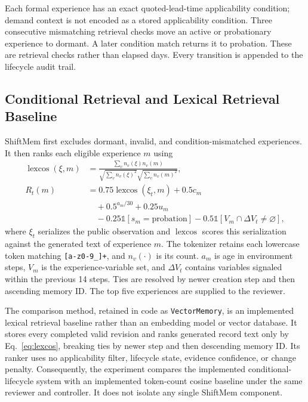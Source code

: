 Each formal experience has an exact quoted-lead-time applicability condition;
demand context is not encoded as a stored applicability condition.
Three consecutive mismatching retrieval checks move an active or probationary
experience to dormant. A later condition match returns it to probation. These
are retrieval checks rather than elapsed days. Every transition is appended to
the lifecycle audit trail.

\subsection{Conditional Retrieval and Lexical Retrieval Baseline}
\label{sec:retrieval}

ShiftMem first excludes dormant, invalid, and condition-mismatched experiences.
It then ranks each eligible experience $m$ using
\begin{align}
 \operatorname{lexcos}(\xi,m)
 &=\frac{\sum_v n_v(\xi)n_v(m)}
 {\sqrt{\sum_v n_v(\xi)^2}\sqrt{\sum_v n_v(m)^2}}, \label{eq:lexcos}\\
 R_t(m)&=0.75\operatorname{lexcos}(\xi_t,m)+0.5c_m \nonumber\\
 &\quad{}+0.5^{a_m/30}+0.25u_m \nonumber\\
 &\quad{}-0.25\mathbb{1}[s_m=\mathrm{probation}]
 -0.5\mathbb{1}[V_m\cap\Delta V_t\neq\varnothing],
 \label{eq:retrieval-score}
\end{align}
where $\xi_t$ serializes the public observation and $\operatorname{lexcos}$
scores this serialization against the generated text of experience $m$. The tokenizer retains
each lowercase token matching \texttt{[a-z0-9\_]+}, and $n_v(\cdot)$ is its count.
$a_m$ is age in environment steps, $V_m$ is the experience-variable set, and
$\Delta V_t$ contains variables signaled within the previous 14 steps. Ties are
resolved by newer creation step and then ascending memory ID. The top five
experiences are supplied to the reviewer.

The comparison method, retained in code as \texttt{VectorMemory}, is an
implemented lexical retrieval baseline rather than an embedding model or vector
database. It stores every completed valid revision and ranks generated record
text only by Eq.~\eqref{eq:lexcos}, breaking ties by newer step and then
descending memory ID. Its ranker uses no applicability filter, lifecycle state,
evidence confidence, or change penalty.
Consequently, the experiment compares the implemented conditional-lifecycle
system with an implemented token-count cosine baseline under the same reviewer
and controller. It does not isolate any single ShiftMem component.

